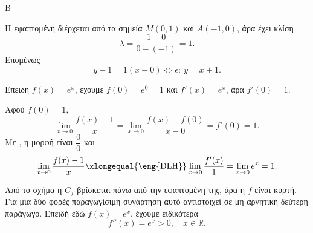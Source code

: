 
\begin{thema}{Β}
\begin{erwthma}
\item Η εφαπτομένη διέρχεται από τα σημεία $M(0,1)$ και $A(-1,0)$, άρα έχει κλίση
\[
\lambda=\frac{1-0}{0-(-1)}=1.
\]
Επομένως
\[
y-1=1(x-0)\Leftrightarrow \epsilon:\ y=x+1.
\]

\item Επειδή $f(x)=e^x$, έχουμε $f(0)=e^0=1$ και $f'(x)=e^x$, άρα $f'(0)=1$.

\item Αφού $f(0)=1$,
\[
\lim_{x\to0}\frac{f(x)-1}{x}
=\lim_{x\to0}\frac{f(x)-f(0)}{x-0}=f'(0)=1.
\]
Με , η μορφή είναι $\dfrac00$ και
\[
\lim_{x\to0}\frac{f(x)-1}{x}
\xlongequal{\text{\eng{DLH}}}
\lim_{x\to0}\frac{f'(x)}{1}
=\lim_{x\to0}e^x=1.
\]

\item Από το σχήμα η $C_f$ βρίσκεται πάνω από την εφαπτομένη της, άρα η $f$ είναι κυρτή. Για μια δύο φορές παραγωγίσιμη συνάρτηση αυτό αντιστοιχεί σε μη αρνητική δεύτερη παράγωγο. Επειδή εδώ $f(x)=e^x$, έχουμε ειδικότερα
\[
f''(x)=e^x>0,\quad x\in\mathbb{R}.
\]
\end{erwthma}
\end{thema}

